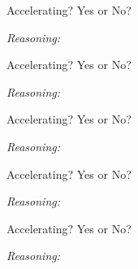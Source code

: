 \documentclass[answers]{exam}
\begin{document}
\begin{questions}
\begin{multicols}{2}
\question %
Accelerating? Yes or No?


\ifprintanswers \else \textit{Reasoning:} \fillin[][0.73\linewidth]
\fillwithlines{7mm}
\fi

\question %
Accelerating? Yes or No?


\ifprintanswers \else \textit{Reasoning:} \fillin[][0.73\linewidth]
\fillwithlines{7mm}
\fi

\question %
Accelerating? Yes or No?


\ifprintanswers \else \textit{Reasoning:} \fillin[][0.73\linewidth]
\fillwithlines{7mm}
\fi

\question \label{H2UaC} %
Accelerating? Yes or No?


\ifprintanswers \else \textit{Reasoning:} \fillin[][0.73\linewidth]
\fillwithlines{7mm}
\fi

\question %
Accelerating? Yes or No?


\ifprintanswers \else \textit{Reasoning:} \fillin[][0.73\linewidth]
\fillwithlines{7mm}
\fi





















\end{multicols}
\end{questions}
\end{document}
